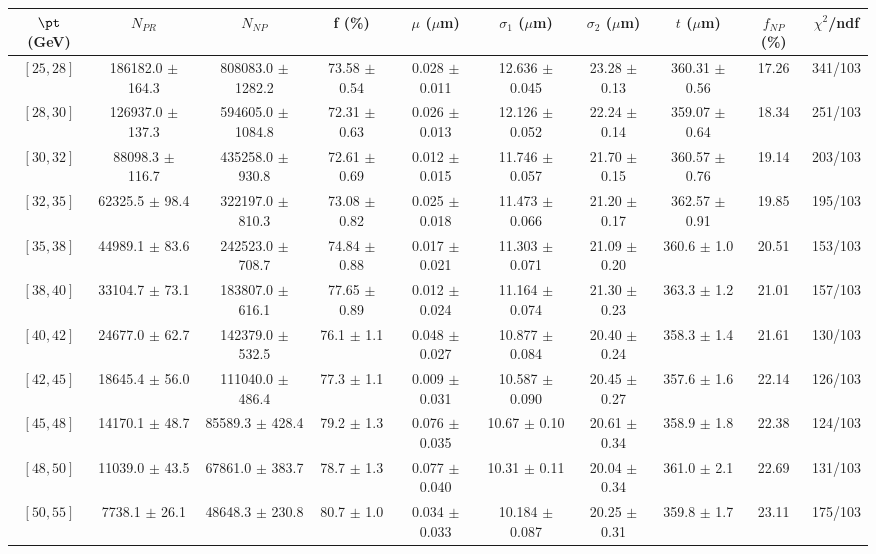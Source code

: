 \begin{tabular}{c||c|c|c|c|c|c|c||c|c}
$\pt$ (GeV) & $N_{PR}$ & $N_{NP}$ & f (\%) & $\mu$ ($\mu$m) & $\sigma_1$ ($\mu$m) & $\sigma_2$ ($\mu$m)  & $t$ ($\mu$m) & $f_{NP}$ (\%) & $\chi^2$/ndf \\
\hline
$[25, 28]$ & 186182.0 $\pm$ 164.3 & 808083.0 $\pm$ 1282.2 & 73.58 $\pm$ 0.54 & 0.028 $\pm$ 0.011 & 12.636 $\pm$ 0.045 & 23.28 $\pm$ 0.13 & 360.31 $\pm$ 0.56 & 17.26 & 341/103\\
$[28, 30]$ & 126937.0 $\pm$ 137.3 & 594605.0 $\pm$ 1084.8 & 72.31 $\pm$ 0.63 & 0.026 $\pm$ 0.013 & 12.126 $\pm$ 0.052 & 22.24 $\pm$ 0.14 & 359.07 $\pm$ 0.64 & 18.34 & 251/103\\
$[30, 32]$ & 88098.3 $\pm$ 116.7 & 435258.0 $\pm$ 930.8 & 72.61 $\pm$ 0.69 & 0.012 $\pm$ 0.015 & 11.746 $\pm$ 0.057 & 21.70 $\pm$ 0.15 & 360.57 $\pm$ 0.76 & 19.14 & 203/103\\
$[32, 35]$ & 62325.5 $\pm$ 98.4 & 322197.0 $\pm$ 810.3 & 73.08 $\pm$ 0.82 & 0.025 $\pm$ 0.018 & 11.473 $\pm$ 0.066 & 21.20 $\pm$ 0.17 & 362.57 $\pm$ 0.91 & 19.85 & 195/103\\
$[35, 38]$ & 44989.1 $\pm$ 83.6 & 242523.0 $\pm$ 708.7 & 74.84 $\pm$ 0.88 & 0.017 $\pm$ 0.021 & 11.303 $\pm$ 0.071 & 21.09 $\pm$ 0.20 & 360.6 $\pm$ 1.0 & 20.51 & 153/103\\
$[38, 40]$ & 33104.7 $\pm$ 73.1 & 183807.0 $\pm$ 616.1 & 77.65 $\pm$ 0.89 & 0.012 $\pm$ 0.024 & 11.164 $\pm$ 0.074 & 21.30 $\pm$ 0.23 & 363.3 $\pm$ 1.2 & 21.01 & 157/103\\
$[40, 42]$ & 24677.0 $\pm$ 62.7 & 142379.0 $\pm$ 532.5 & 76.1 $\pm$ 1.1 & 0.048 $\pm$ 0.027 & 10.877 $\pm$ 0.084 & 20.40 $\pm$ 0.24 & 358.3 $\pm$ 1.4 & 21.61 & 130/103\\
$[42, 45]$ & 18645.4 $\pm$ 56.0 & 111040.0 $\pm$ 486.4 & 77.3 $\pm$ 1.1 & 0.009 $\pm$ 0.031 & 10.587 $\pm$ 0.090 & 20.45 $\pm$ 0.27 & 357.6 $\pm$ 1.6 & 22.14 & 126/103\\
$[45, 48]$ & 14170.1 $\pm$ 48.7 & 85589.3 $\pm$ 428.4 & 79.2 $\pm$ 1.3 & 0.076 $\pm$ 0.035 & 10.67 $\pm$ 0.10 & 20.61 $\pm$ 0.34 & 358.9 $\pm$ 1.8 & 22.38 & 124/103\\
$[48, 50]$ & 11039.0 $\pm$ 43.5 & 67861.0 $\pm$ 383.7 & 78.7 $\pm$ 1.3 & 0.077 $\pm$ 0.040 & 10.31 $\pm$ 0.11 & 20.04 $\pm$ 0.34 & 361.0 $\pm$ 2.1 & 22.69 & 131/103\\
$[50, 55]$ & 7738.1 $\pm$ 26.1 & 48648.3 $\pm$ 230.8 & 80.7 $\pm$ 1.0 & 0.034 $\pm$ 0.033 & 10.184 $\pm$ 0.087 & 20.25 $\pm$ 0.31 & 359.8 $\pm$ 1.7 & 23.11 & 175/103\\

\end{tabular}
